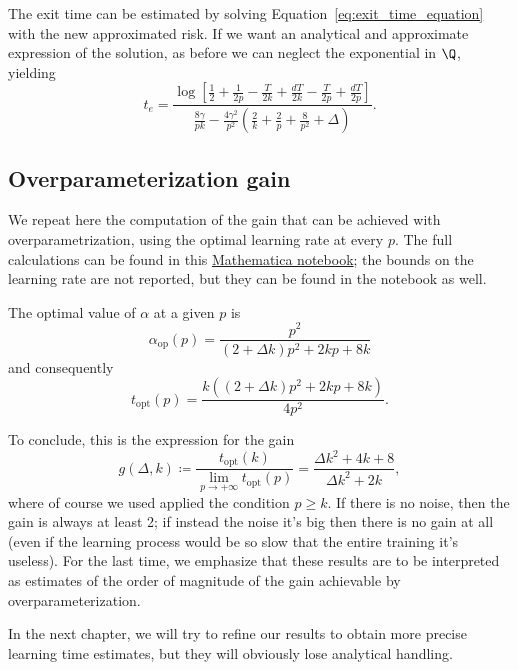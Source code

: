 The exit time can be estimated by solving Equation~\eqref{eq:exit_time_equation} with the new approximated risk.
If we want an analytical and approximate expression of the solution,
as before we can neglect the exponential in \(\Q\), yielding
\[t_e = \frac{\log \left[\frac12 + \frac{1}{2p} - \frac{T}{2k} + \frac{dT}{2k} - \frac{T}{2p} + \frac{dT}{2p} \right]}
             {\frac{8 \gamma}{pk} -\frac{4 \gamma^2}{p^2} \left(\frac2k +\frac{2}{p} + \frac{8}{p^2} + \Delta \right)}.
\]

\subsection{Overparameterization gain}
We repeat here the computation of the gain that can be achieved with overparametrization,
using the optimal learning rate at every \(p\).
The full calculations can be found in this \href{https://github.com/arn4/master-thesis/blob/main/analytical-calculations%20/optimizing-alpha-k_generic.nb}{Mathematica notebook}; 
the bounds on the learning rate are not reported, but they can be found in the notebook as well.

The optimal value of \(\alpha\) at a given \(p\) is
\[
  \alpha_\text{op}(p) = \frac{p^2}{(2+\Delta k) p^2+2 k p+8 k}
\]
and consequently
\[
  t_\text{opt}{(p)} = \frac{k \left((2+\Delta k) p^2+2 k p+8 k\right)}{4 p^2}.
\]

To conclude, this is the expression for the gain
\[
  g{(\Delta, k)} \coloneqq \frac{t_\text{opt}{(k)}}{\lim_{p\to+\infty}t_\text{opt}{(p)}} =
    \frac{\Delta k^2 + 4k + 8}{\Delta k^2 + 2k},
\]
where of course we used applied the condition \(p\ge k\).
If there is no noise, then the gain is always at least 2; 
if instead the noise it's big then there is no gain at all (even if the learning process would be so slow that the entire training it's useless).
For the last time, we emphasize that these results are to be interpreted as estimates of the order of magnitude of the gain achievable by overparameterization.

In the next chapter, we will try to refine our results to obtain more precise learning time estimates, but they will obviously lose analytical handling.